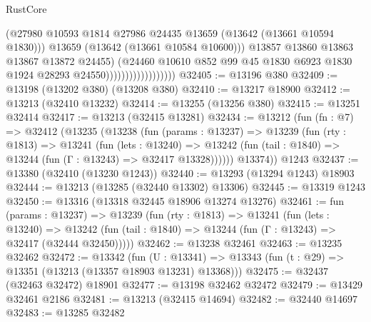 \begin{lexlean}{RustCore}
\begin{coremodule}
                                          (@27980
                                            @10593
                                            @1814
                                            @27986
                                            @24435
                                            @13659
                                            (@13642 (@13661 @10594 @1830)))
                                          @13659
                                          (@13642 (@13661 @10584 @10600)))
                                        @13857
                                        @13860
                                        @13863
                                        @13867
                                        @13872
                                        @24455)
                                      (@24460
                                        @10610
                                        @852
                                        @99
                                        @45
                                        @1830
                                        @6923
                                        @1830
                                        @1924
                                        @28293
                                        @24550))))))))))))))))))
@32405 := @13196 @380
@32409 := @13198 (@13202 @380) (@13208 @380)
@32410 := @13217 @18900
@32412 := @13213 (@32410 @13232)
@32414 := @13255 (@13256 @380)
@32415 := @13251 @32414
@32417 := @13213 (@32415 @13281)
@32434 := @13212
    (fun (fn : @7) =>
    @32412
      (@13235
        (@13238
          (fun (params : @13237) =>
          @13239
            (fun (rty : @1813) =>
            @13241
              (fun (lets : @13240) =>
              @13242 (fun (tail : @1840) => @13244 (fun (Γ : @13243) => @32417 @13328))))))
        @13374))
    @1243
@32437 := @13380 (@32410 (@13230 @1243))
@32440 := @13293 (@13294 @1243) @18903
@32444 := @13213 (@13285 (@32440 @13302) @13306)
@32445 := @13319 @1243
@32450 := @13316 (@13318 @32445 @18906 @13274 @13276)
@32461 := fun (params : @13237) =>
  @13239
    (fun (rty : @1813) =>
    @13241
      (fun (lets : @13240) =>
      @13242 (fun (tail : @1840) => @13244 (fun (Γ : @13243) => @32417 (@32444 @32450)))))
@32462 := @13238 @32461
@32463 := @13235 @32462
@32472 := @13342
    (fun (U : @13341) => @13343 (fun (t : @29) => @13351 (@13213 (@13357 @18903 @13231) @13368)))
@32475 := @32437 (@32463 @32472) @18901
@32477 := @13198 @32462 @32472
@32479 := @13429 @32461 @2186
@32481 := @13213 (@32415 @14694)
@32482 := @32440 @14697
@32483 := @13285 @32482

\end{coremodule}
\end{lexlean}
